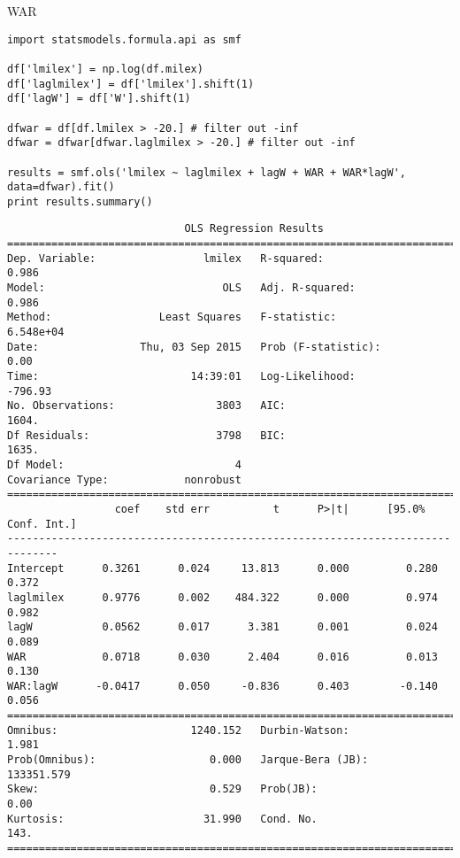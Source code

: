 \documentclass[12pt,fleqn]{article}\usepackage{common}
\begin{document}

WAR

\begin{verbatim}
import statsmodels.formula.api as smf

df['lmilex'] = np.log(df.milex)
df['laglmilex'] = df['lmilex'].shift(1)
df['lagW'] = df['W'].shift(1)

dfwar = df[df.lmilex > -20.] # filter out -inf
dfwar = dfwar[dfwar.laglmilex > -20.] # filter out -inf

results = smf.ols('lmilex ~ laglmilex + lagW + WAR + WAR*lagW', data=dfwar).fit()
print results.summary()
\end{verbatim}

\begin{verbatim}
                            OLS Regression Results                            
==============================================================================
Dep. Variable:                 lmilex   R-squared:                       0.986
Model:                            OLS   Adj. R-squared:                  0.986
Method:                 Least Squares   F-statistic:                 6.548e+04
Date:                Thu, 03 Sep 2015   Prob (F-statistic):               0.00
Time:                        14:39:01   Log-Likelihood:                -796.93
No. Observations:                3803   AIC:                             1604.
Df Residuals:                    3798   BIC:                             1635.
Df Model:                           4                                         
Covariance Type:            nonrobust                                         
==============================================================================
                 coef    std err          t      P>|t|      [95.0% Conf. Int.]
------------------------------------------------------------------------------
Intercept      0.3261      0.024     13.813      0.000         0.280     0.372
laglmilex      0.9776      0.002    484.322      0.000         0.974     0.982
lagW           0.0562      0.017      3.381      0.001         0.024     0.089
WAR            0.0718      0.030      2.404      0.016         0.013     0.130
WAR:lagW      -0.0417      0.050     -0.836      0.403        -0.140     0.056
==============================================================================
Omnibus:                     1240.152   Durbin-Watson:                   1.981
Prob(Omnibus):                  0.000   Jarque-Bera (JB):           133351.579
Skew:                           0.529   Prob(JB):                         0.00
Kurtosis:                      31.990   Cond. No.                         143.
==============================================================================

\end{verbatim}
\end{document}
